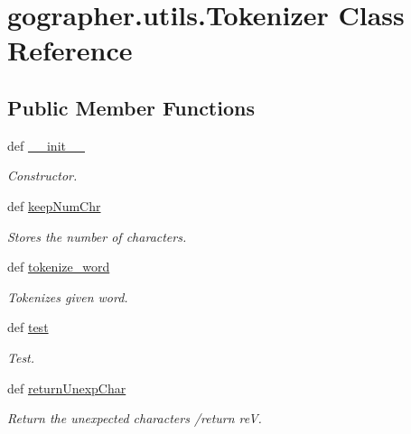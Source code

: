 \hypertarget{classgographer_1_1utils_1_1_tokenizer}{\section{gographer.\-utils.\-Tokenizer Class Reference}
\label{classgographer_1_1utils_1_1_tokenizer}
}
\subsection*{Public Member Functions}
\begin{DoxyCompactItemize}
\item 
\hypertarget{classgographer_1_1utils_1_1_tokenizer_aeaffd01055cb88465e924ffec3c47a01}{def \hyperlink{classgographer_1_1utils_1_1_tokenizer_aeaffd01055cb88465e924ffec3c47a01}{\-\_\-\-\_\-init\-\_\-\-\_\-}}\label{classgographer_1_1utils_1_1_tokenizer_aeaffd01055cb88465e924ffec3c47a01}

\begin{DoxyCompactList}\small\item\em Constructor. \end{DoxyCompactList}\item 
def \hyperlink{classgographer_1_1utils_1_1_tokenizer_a0e91693b7e437a4a4ddf3bdca2050711}{keep\-Num\-Chr}
\begin{DoxyCompactList}\small\item\em Stores the number of characters. \end{DoxyCompactList}\item 
def \hyperlink{classgographer_1_1utils_1_1_tokenizer_a76ce16b497880c2c90606d01b6ce9be4}{tokenize\-\_\-word}
\begin{DoxyCompactList}\small\item\em Tokenizes given word. \end{DoxyCompactList}\item 
def \hyperlink{classgographer_1_1utils_1_1_tokenizer_ab1b2f66122946619ce1739731aded5bc}{test}
\begin{DoxyCompactList}\small\item\em Test. \end{DoxyCompactList}\item 
\hypertarget{classgographer_1_1utils_1_1_tokenizer_aecf2e9c2c1c5f084f52be6eff65bd348}{def \hyperlink{classgographer_1_1utils_1_1_tokenizer_aecf2e9c2c1c5f084f52be6eff65bd348}{return\-Unexp\-Char}}\label{classgographer_1_1utils_1_1_tokenizer_aecf2e9c2c1c5f084f52be6eff65bd348}

\begin{DoxyCompactList}\small\item\em Return the unexpected characters /return re\-V. \end{DoxyCompactList}\end{DoxyCompactItemize}

